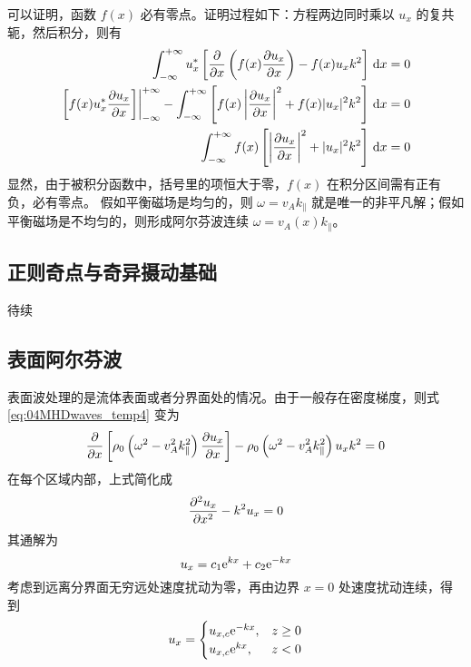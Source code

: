 可以证明，函数 $f(x)$ 必有零点。证明过程如下：方程两边同时乘以 $u_x$ 的复共轭，然后积分，则有
\begin{equation}\begin{aligned}
\int_{-\infty}^{+\infty} u_x^* \left[
    \frac{\partial {}}{\partial {x}} \left( f(x) \frac{\partial {u_x}}{\partial {x}} \right)
    - f(x) u_x k^2
\right] \, \mathop{}\!\mathrm{d} x &=0 \\
\left.\left[ f(x) u_x^* \frac{\partial {u_x}}{\partial {x}} \right]\right|_{-\infty}^{+\infty}
- \int_{-\infty}^{+\infty} \left[
    f(x) \left| \frac{\partial {u_x}}{\partial {x}} \right|^2
    + f(x) |u_x|^2 k^2
\right] \, \mathop{}\!\mathrm{d} x &= 0 \\
\int_{-\infty}^{+\infty}
    f(x) \left[ \left| \frac{\partial {u_x}}{\partial {x}} \right|^2
    + |u_x|^2 k^2 \right]
\, \mathop{}\!\mathrm{d} x &= 0
\end{aligned}\end{equation}
显然，由于被积分函数中，括号里的项恒大于零，$f(x)$ 在积分区间需有正有负，必有零点。
假如平衡磁场是均匀的，则 $\omega = v_A k_\parallel$ 就是唯一的非平凡解；假如平衡磁场是不均匀的，则形成阿尔芬波连续 $\omega = v_A(x) k_\parallel$。

\subsection{正则奇点与奇异摄动基础}

待续

\subsection{表面阿尔芬波}

表面波处理的是流体表面或者分界面处的情况。由于一般存在密度梯度，则式 \ref{eq:04MHDwaves_temp4} 变为
\begin{equation}
\frac{\partial {}}{\partial {x}} \left[ \rho_0 \left( \omega^2 - v_A^2 k_\parallel^2 \right) \frac{\partial {u_x}}{\partial {x}} \right]
- \rho_0 \left( \omega^2 - v_A^2 k_\parallel^2 \right) u_x k^2
= 0
\end{equation}
在每个区域内部，上式简化成
\begin{equation}
\frac{\partial^2 {u_x}}{\partial {x}^2} - k^2 u_x = 0
\end{equation}
其通解为
\begin{equation}
u_x = c_1 \mathrm{e}^{k x} + c_2 \mathrm{e}^{- k x}
\end{equation}
考虑到远离分界面无穷远处速度扰动为零，再由边界 $x = 0$ 处速度扰动连续，得到
\begin{equation}
u_x = \begin{cases}
    u_{x,c} \mathrm{e}^{- k x}, & z \geq 0 \\
    u_{x,c} \mathrm{e}^{k x}  , & z < 0 \\
\end{cases}
\end{equation}

